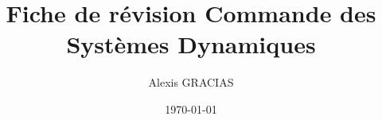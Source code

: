\documentclass[30pt,french]{report}
\title{\Huge Fiche de révision Commande des Systèmes Dynamiques}
\author{\LARGE Alexis GRACIAS}
\date{\Large \today}
\begin{document}
\maketitle
\Large \tableofcontents







\end{document}
